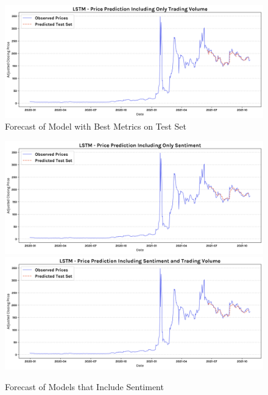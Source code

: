 \documentclass[11pt, a4paper]{article}
\begin{document}
\begin{figure}[!htb]
    \centering
    \includegraphics[width=\textwidth]{only_trading_volume_pred.png}
    \caption{Forecast of Model with Best Metrics on Test Set}
    \label{fig:model_only_trading_volume_forecast_test_set}
\end{figure}

\begin{figure}[!htb]
    \centering
    \includegraphics[width=\textwidth]{only_sentiment_pred.png}
    \includegraphics[width=\textwidth]{all_features_pred.png}
    \caption{Forecast of Models that Include Sentiment}
    \label{fig:forecast_including_sentiment_model}
\end{figure}
\end{document}
